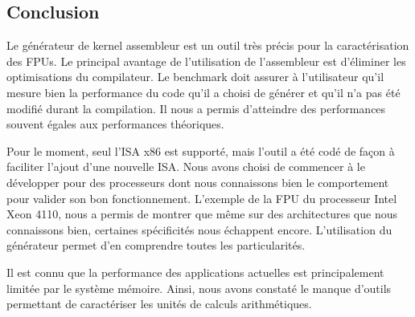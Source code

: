         
        




    
    



    

\subsection{Conclusion}
    
    Le générateur de kernel assembleur est un outil très précis pour la caractérisation des FPUs. Le principal avantage de l'utilisation de l'assembleur est d'éliminer les optimisations du compilateur. Le benchmark doit assurer à l'utilisateur qu'il mesure bien la performance du code qu'il a choisi de générer et qu'il n'a pas été modifié durant la compilation. Il nous a permis d'atteindre des performances souvent égales aux performances théoriques. 
    
    Pour le moment, seul l'ISA x86 est supporté, mais l'outil a été codé de façon à faciliter l'ajout d'une nouvelle ISA. Nous avons choisi de commencer à le développer pour des processeurs dont nous connaissons bien le comportement pour valider son bon fonctionnement. L'exemple de la FPU du processeur Intel Xeon 4110, nous a permis de montrer que même sur des architectures que nous connaissons bien, certaines spécificités nous échappent encore. L'utilisation du générateur permet d'en comprendre toutes les particularités.
    
    Il est connu que la performance des applications actuelles est principalement limitée par le système mémoire. Ainsi, nous avons constaté le manque d'outils permettant de caractériser les unités de calculs arithmétiques. 
    
